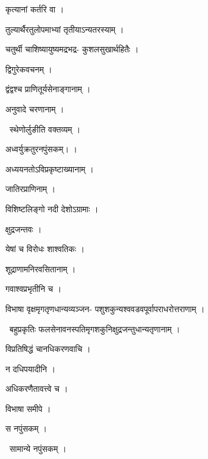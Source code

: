 \documentclass[10pt, openany, oneside]{book}
\begin{document}
\noindent कृत्यानां कर्तरि वा ।

\noindent तुल्यार्थैरतुलोपमाभ्यां तृतीयाऽन्यतरस्याम् ।

\noindent चतुर्थी चाशिष्यायुष्यमद्रभद्र- कुशलसुखार्थहितैः ।

\noindent द्विगुरेकवचनम् ।

\noindent द्वंद्वश्च प्राणितूर्यसेनाङ्गानाम् ।

\noindent अनुवादे चरणानाम् ।

\par\noindent\hspace{1.5em}{\vps वा॰}~{\qt स्थेणोर्लुङीति वक्तव्यम् ।}

\noindent अध्वर्युक्रतुरनपुंसकम्। ।

\noindent अध्ययनतोऽविप्रकृष्टाख्यानाम् ।

\noindent जातिरप्राणिनाम् ।

\noindent विशिष्टलिङ्गो नदी देशोऽग्रामाः ।

\noindent क्षुद्रजन्तवः ।

\noindent येषां च विरोधः शाश्वतिकः ।

\noindent शूद्राणामनिरवसितानाम् ।

\noindent गवाश्वप्रभृतीनि च ।

\noindent विभाषा वृक्षमृगतृणधान्यव्यञ्जन- पशुशकुन्यश्ववडवपूर्वापराधरोत्तराणाम् ।

\par\noindent\hspace{1.5em}{\vps वा॰}~{\qt बहुप्रकृतिः फलसेनावनस्पतिमृगशकुनिक्षुद्रजन्तुधान्यतृणानाम् ।}

\noindent विप्रतिषिद्धं चानधिकरणवाचि ।

\noindent न दधिपयादीनि ।

\noindent अधिकरणैतावत्त्वे च ।

\noindent विभाषा समीपे ।

\noindent स नपुंसकम् ।

\par\noindent\hspace{1.5em}{\vps वा॰}~{\qt सामान्ये नपुंसकम् ।}
\end{document}
